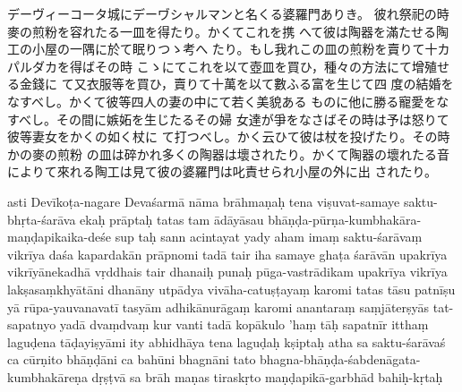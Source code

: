 \newpage
{}
%

デーヴィーコータ城にデーヷシャルマンと名くる婆羅門ありき。
彼れ祭祀の時麥の煎粉を容れたる一皿を得たり。かくてこれを携
へて彼は陶器を滿たせる陶工の小屋の一隅に於て眠りつゝ考へ
たり。もし我れこの皿の煎粉を賣りて十カパルダカを得ばその時
こゝにてこれを以て壺皿を買ひ，種々の方法にて增殖せる金錢に
て又衣服等を買ひ，賣りて十萬を以て數ふる富を生じて四
度の結婚をなすべし。かくて彼等四人の妻の中にて若く美貌ある
ものに他に勝る寵愛をなすべし。その間に嫉妬を生じたるその婦
女達が爭をなさばその時は予は怒りて彼等妻女をかくの如く杖に
て打つべし。かく云ひて彼は杖を投げたり。その時かの麥の煎粉
の皿は碎かれ多くの陶器は壞されたり。かくて陶器の壞れたる音
によりて來れる陶工は見て彼の婆羅門は叱責せられ小屋の外に出
されたり。

\newpage


asti Devīkoṭa-nagare Devaśarmā nāma brāhmaṇaḥ \da{} tena
viṣuvat-samaye saktu-bhṛta-śarāva ekaḥ prāptaḥ \da{} tatas tam
ādāyāsau bhāṇḍa-pūrṇa-kumbhakāra-maṇḍapikaika-deśe sup\-%
taḥ sann acintayat \da{} yady aham imaṃ saktu-śarāvaṃ vikrīya
daśa kapardakān prāpnomi tadā tair iha samaye ghaṭa\-%
śarāvān upakrīya vikrīyānekadhā vṛddhais tair dhanaiḥ
punaḥ pūga-vastrādikam upakrīya vikrīya lakṣasaṃkhyātāni
dhanāny utpādya vivāha-catuṣṭayaṃ karomi \da{} tatas tāsu
patnīṣu yā rūpa-yauvanavatī tasyām adhikānurāgaṃ karomi \da{}
anantaraṃ saṃjāterṣyās tat-sapatnyo yadā dvaṃdvaṃ kur\-%
vanti tadā kopākulo 'haṃ tāḥ sapatnīr itthaṃ laguḍena
tāḍayiṣyāmi \da{} ity abhidhāya tena laguḍaḥ kṣiptaḥ \da{} atha sa
saktu-śarāvaś ca cūrṇito bhāṇḍāni ca bahūni bhagnāni \da{} tato
bhagna-bhāṇḍa-śabdenāgata-kumbhakāreṇa dṛṣṭvā sa brāh\-%
maṇas tiraskṛto maṇḍapikā-garbhād bahiḥ-kṛtaḥ \dd{}



